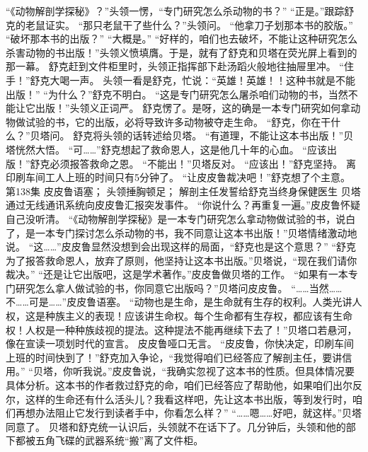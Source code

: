 \documentclass[a4paper,12pt,UTF8,twoside]{ctexbook}
\begin{document}
        “《动物解剖学探秘》？”头领一愣，“专门研究怎么杀动物的书？” 
        “正是。”跟踪舒克的老鼠证实。 
        “那只老鼠干了些什么？”头领问。 
        “他拿刀子划那本书的胶版。” 
        “破坏那本书的出版？” 
        “大概是。” 
        “好样的，咱们也去破坏，不能让这种研究怎么杀害动物的书出版！”头领义愤填膺。于是，就有了舒克和贝塔在荧光屏上看到的那一幕。 
        舒克赶到文件柜里时，头领正指挥部下赴汤蹈火般地往抽屉里冲。 
        “住手！”舒克大喝一声。 
        头领一看是舒克，忙说：“英雄！英雄！！这种书就是不能出版！” 
        “为什么？”舒克不明白。 
        “这是专门研究怎么屠杀咱们动物的书，当然不能让它出版！”头领义正词严。 
        舒克愣了。是呀，这的确是一本专门研究如何拿动物做试验的书，它的出版，必将导致许多动物被夺走生命。 
        “舒克，你在干什么？”贝塔问。 
        舒克将头领的话转述给贝塔。 
        “有道理，不能让这本书出版！”贝塔恍然大悟。 
        “可……”舒克想起了救命恩人，这是他几十年的心血。 
        “应该出版！”舒克必须报答救命之恩。 
        “不能出！”贝塔反对。 
        “应该出！”舒克坚持。 
        离印刷车间工人上班的时间只有5分钟了。 
        “让皮皮鲁裁决吧！”舒克想了个主意。   第138集 
        皮皮鲁语塞； 
        头领捶胸顿足； 
        解剖主任发誓给舒克当终身保健医生   
        贝塔通过无线通讯系统向皮皮鲁汇报突发事件。 
        “你说什么？再重复一遍。”皮皮鲁怀疑自己没听清。 
        “《动物解剖学探秘》是一本专门研究怎么拿动物做试验的书，说白了，是一本专门探讨怎么杀动物的书，我不同意让这本书出版！”贝塔情绪激动地说。 
        “这……”皮皮鲁显然没想到会出现这样的局面，“舒克也是这个意思？” 
        “舒克为了报答救命恩人，放弃了原则，他坚持让这本书出版。”贝塔说，“现在我们请你裁决。” 
        “还是让它出版吧，这是学术著作。”皮皮鲁做贝塔的工作。 
        “如果有一本专门研究怎么拿人做试验的书，你同意它出版吗？”贝塔问皮皮鲁。 
        “……当然……不……可是……”皮皮鲁语塞。 
        “动物也是生命，是生命就有生存的权利。人类光讲人权，这是种族主义的表现！应该讲生命权。每个生命都有生存权，都应该有生命权！人权是一种种族歧视的提法。这种提法不能再继续下去了！”贝塔口若悬河，像在宣读一项划时代的宣言。 
        皮皮鲁哑口无言。 
        “皮皮鲁，你快决定，印刷车间上班的时间快到了！”舒克加入争论，“我觉得咱们已经答应了解剖主任，要讲信用。” 
        “贝塔，你听我说。”皮皮鲁说，“我确实忽视了这本书的性质。但具体情况要具体分析。这本书的作者救过舒克的命，咱们已经答应了帮助他，如果咱们出尔反尔，这样的生命还有什么活头儿？我看这样吧，先让这本书出版，等到发行时，咱们再想办法阻止它发行到读者手中，你看怎么样？” 
        “……嗯……好吧，就这样。”贝塔同意了。 
        贝塔和舒克统一认识后，头领就不在话下了。几分钟后，头领和他的部下都被五角飞碟的武器系统“搬”离了文件柜。 
\end{document}
